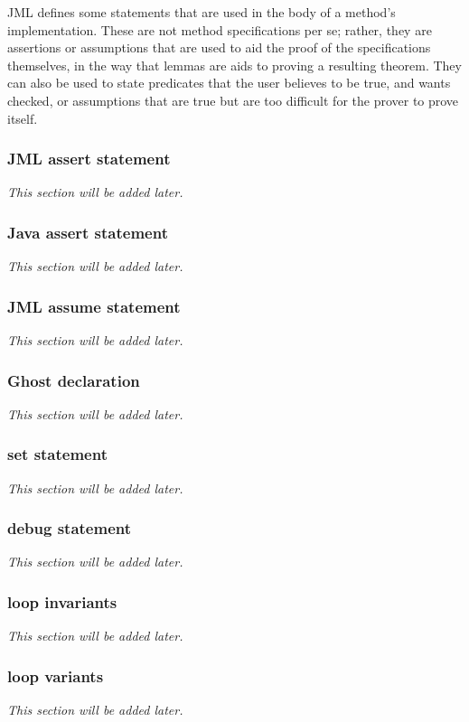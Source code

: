 JML defines some statements that are used in the body of a method's implementation. These are not method specifications per se; 
rather, they are assertions or assumptions that are used to aid the proof of the specifications themselves, in the way that lemmas
are aids to proving a resulting theorem. They can also be used to state predicates that the user believes to be true, and wants checked, or assumptions that are true but are too difficult for the prover to prove itself.

\subsubsection{JML assert statement}
\textit{This section will be added later.} %

\subsubsection{Java assert statement}
\textit{This section will be added later.} %

\subsubsection{JML assume statement}
\textit{This section will be added later.} %

\subsubsection{Ghost declaration}
\textit{This section will be added later.} %

\subsubsection{set statement}
\textit{This section will be added later.} %


\subsubsection{debug statement}
\textit{This section will be added later.} %


\subsubsection{loop invariants}
\textit{This section will be added later.} %

\subsubsection{loop variants}
\textit{This section will be added later.} %


